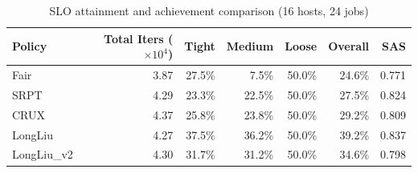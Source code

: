 \begin{table}[t]
\centering
\caption{SLO attainment and achievement comparison (16 hosts, 24 jobs)}
\label{tab:slo_16host}
\begin{tabular}{l|r|r|r|r|r|r}
\hline
Policy & Total Iters ($\times 10^4$) & Tight & Medium & Loose & Overall & SAS \\
\hline
Fair & 3.87 & 27.5\% & 7.5\% & 50.0\% & 24.6\% & 0.771 \\
SRPT & 4.29 & 23.3\% & 22.5\% & 50.0\% & 27.5\% & 0.824 \\
CRUX & 4.37 & 25.8\% & 23.8\% & 50.0\% & 29.2\% & 0.809 \\
LongLiu & 4.27 & 37.5\% & 36.2\% & 50.0\% & 39.2\% & 0.837 \\
LongLiu_v2 & 4.30 & 31.7\% & 31.2\% & 50.0\% & 34.6\% & 0.798 \\
\hline
\end{tabular}
\end{table}
